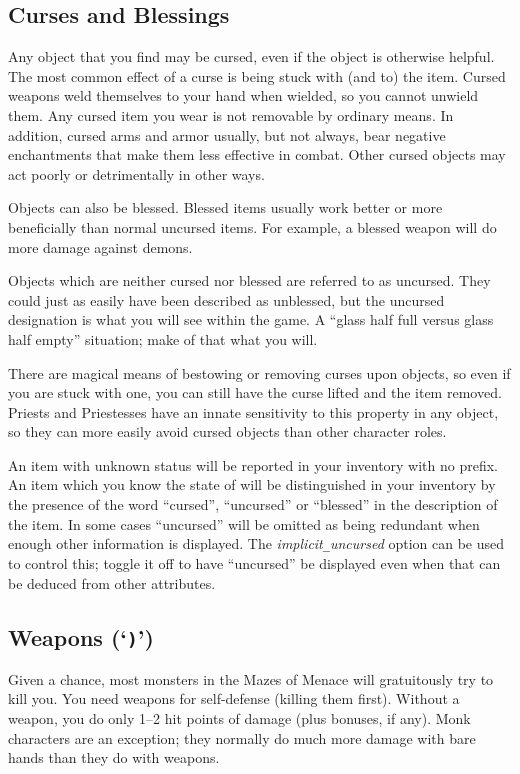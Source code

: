 \subsection*{Curses and Blessings}

Any object that you find may be cursed, even if the object is
otherwise helpful.  The most common effect of a curse is being stuck
with (and to) the item.  Cursed weapons weld themselves to your hand
when wielded, so you cannot unwield them.  Any cursed item you wear
is not removable by ordinary means.  In addition, cursed arms and armor
usually, but not always, bear negative enchantments that make them
less effective in combat.  Other cursed objects may act poorly or
detrimentally in other ways.

Objects can also be blessed.  Blessed items usually work better or
more beneficially than normal uncursed items.  For example, a blessed
weapon will do more damage against demons.

Objects which are neither cursed nor blessed are referred to as uncursed.
They could just as easily have been described as unblessed, but the
uncursed designation is what you will see within the game.  A ``glass
half full versus glass half empty'' situation; make of that what you will.

There are magical means of bestowing or removing curses upon objects,
so even if you are stuck with one, you can still have the curse
lifted and the item removed.  Priests and Priestesses have an innate
sensitivity to this property in any object, so they can more easily avoid
cursed objects than other character roles.

An item with unknown status will be reported in your inventory with no prefix.
An item which you know the state of will be distinguished in your inventory
by the presence of the word ``cursed'', ``uncursed'' or ``blessed'' in the
description of the item.
In some cases ``uncursed'' will be omitted as being redundant when
enough other information is displayed.
The
{\it implicit\verb+_+uncursed\/}
option can be used to control this; toggle it off to have ``uncursed''
be displayed even when that can be deduced from other attributes.

\subsection*{Weapons (`{\tt )}')}

Given a chance, most monsters in the Mazes of Menace will gratuitously try to
kill you.  You need weapons for self-defense (killing them first).  Without a
weapon, you do only 1--2 hit points of damage (plus bonuses, if any).
Monk characters are an exception; they normally do much more damage with
bare hands than they do with weapons.

